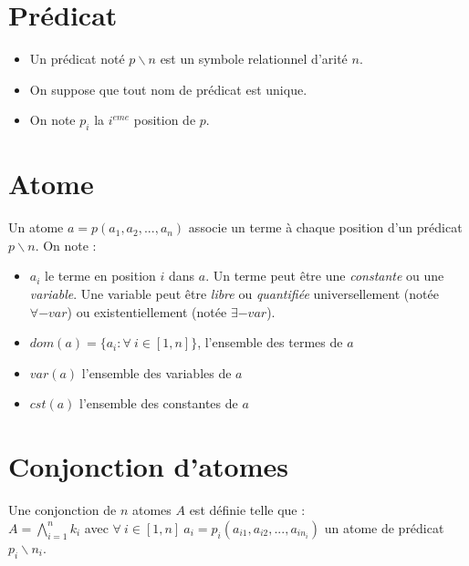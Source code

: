 
\section{Pr\'edicat}\label{def_predicat}
\begin{itemize}
	\item Un pr\'edicat not\'e $p \backslash n$ est un symbole relationnel d'arit\'e $n$.
	\item On suppose que tout nom de pr\'edicat est unique.
	\item On note $p_{i}$ la $i^{eme}$ position de $p$.
\end{itemize}

\section{Atome}\label{def_atome}
Un atome $a = p(a_{1},a_{2},...,a_{n})$ associe un terme \`a chaque position d'un pr\'edicat $p \backslash n$.
On note :
\begin{itemize}
	\item $a_{i}$ le terme en position $i$ dans $a$. Un terme peut \^etre une {\em constante} 
	ou une {\em variable}.
	Une variable peut \^etre {\em libre}  ou {\em quantifiée} universellement 
	(not\'ee $\forall-var$) ou existentiellement (not\'ee $\exists-var$).
	\item $dom(a) = \{a_{i} : \forall\ i \in [1,n]\}$, l'ensemble des termes de $a$
	\item $var(a)$ l'ensemble des variables de $a$
	\item $cst(a)$ l'ensemble des constantes de $a$
\end{itemize}

\section{Conjonction d'atomes}\label{def_conjonction}
Une conjonction de $n$ atomes $A$ est définie telle que :\\
$A = \bigwedge_{i = 1}^{n}k_i$
avec $\forall\ i \in [1,n]\ a_i = p_i(a_{i1},a_{i2},...,a_{in_i})$ un atome de prédicat 
$p_i \backslash n_i$. 

